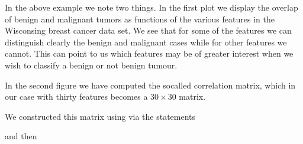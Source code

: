 \documentclass[letterpaper,10pt,english]{sphinxmanual}
\begin{document}
\noindent{}

\noindent{}

\begin{sphinxVerbatim}
\end{sphinxVerbatim}

In the above example we note two things. In the first plot we display
the overlap of benign and malignant tumors as functions of the various
features in the Wisconsing breast cancer data set. We see that for
some of the features we can distinguish clearly the benign and
malignant cases while for other features we cannot. This can point to
us which features may be of greater interest when we wish to classify
a benign or not benign tumour.

In the second figure we have computed the so\sphinxhyphen{}called correlation
matrix, which in our case with thirty features becomes a \(30\times 30\)
matrix.

We constructed this matrix using  via the statements

\begin{sphinxVerbatim}[commandchars=\\\{\}]
   
\end{sphinxVerbatim}

and then

\begin{sphinxVerbatim}[commandchars=\\\{\}]
  
\end{sphinxVerbatim}
\end{document}
